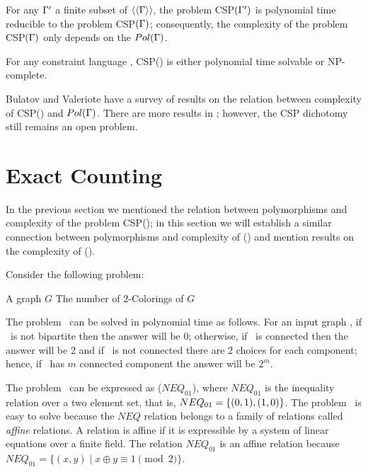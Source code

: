 \begin{cor}
For any \(\Gamma'\) a finite subset of \(\langle\langle \Gamma \rangle\rangle\),
the problem CSP\((\Gamma')\) is polynomial time reducible to the problem CSP\((\Gamma)\);
consequently, the complexity of the problem CSP\((\Gamma)\) only depends on the \(Pol(\Gamma)\)\@.
\end{cor}

\begin{conj} 
For any constraint language \mrelset, CSP(\mrelset) is either polynomial time solvable or NP-complete.
\end{conj}

Bulatov and Valeriote \cite{recent08} have a survey of results on the relation between complexity of CSP(\mrelset) and \(Pol(\Gamma)\). There are more results in \cite{dur628, valeriote}; however,
the CSP dichotomy still remains an open problem. 

\section{Exact Counting}
In the previous section we mentioned the relation between polymorphisms and complexity of
the problem CSP(\mrelset); in this section we will establish a similar connection 
between polymorphisms and complexity of \ccsp(\mrelset) and mention 
results on the complexity of \ccsp(\mrelset)\@.

Consider the following problem:

\pdef{\cdcol}
{A graph \(G\)}
{The number of 2-Colorings of \(G\)}

The problem \cdcol\  can be solved in polynomial time as follows.
For an input graph \mG, if \mG\ is not bipartite then the answer will be \(0\); otherwise,
if \mG\ is connected then the answer will be 2 and if \mG\ is not connected
there are 2 choices for each component; hence, if \mG\ has \(m\)
connected component the answer will be \(2^m\)\@.

The problem \cdcol\  can be expressed as \ccsp(\(NEQ_{01}\)), where
\(NEQ_{01}\) is the inequality relation over a two element set, that is,
\(NEQ_{01}=\{{(0,1),(1,0)}\}\)\@. 
The problem \cdcol\ is easy to solve because
the \(NEQ\) relation belongs to a family of relations called \emph{affine} relations.
A relation is affine if it is expressible by a system of linear equations over a
finite field. The relation \(NEQ_{01}\) is an 
affine relation because \(NEQ_{01} = \{(x,y)\mid x\oplus y \equiv 1 \pmod{2}\}\)\@.


